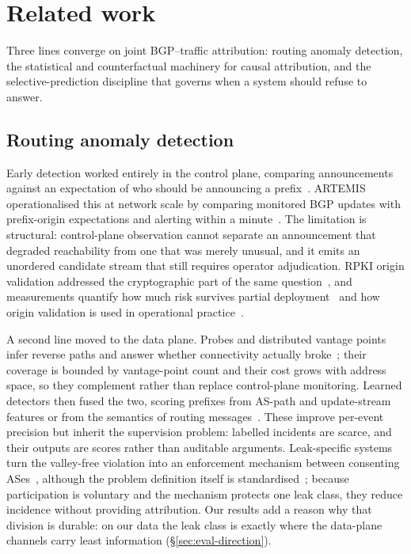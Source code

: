 \section{Related work}
\label{sec:related}

Three lines converge on joint BGP--traffic attribution: routing anomaly
detection, the statistical and counterfactual machinery for causal
attribution, and the selective-prediction discipline that governs when a
system should refuse to answer.

\subsection{Routing anomaly detection}

Early detection worked entirely in the control plane, comparing
announcements against an expectation of who should be announcing a
prefix~\cite{rfc6811}. ARTEMIS operationalised this at network scale by
comparing monitored BGP updates with prefix-origin expectations and
alerting within a minute~\cite{artemis}. The limitation is structural:
control-plane observation cannot separate an announcement that degraded
reachability from one that was merely unusual, and it emits an unordered
candidate stream that still requires operator adjudication. RPKI origin
validation addressed the cryptographic part of the same
question~\cite{rfc6811,rodday-2024-rpki}, and measurements quantify how
much risk survives partial deployment~\cite{rpki-coming-of-age-2019} and
how origin validation is used in operational practice~\cite{rovista-2023}.

A second line moved to the data plane. Probes and distributed vantage
points infer reverse paths and answer whether connectivity actually
broke~\cite{netalyzr-2013}; their coverage is bounded by vantage-point
count and their cost grows with address space, so they complement rather
than replace control-plane monitoring. Learned detectors then fused the
two, scoring prefixes from AS-path and update-stream features or from the
semantics of routing messages~\cite{beam2024}. These improve per-event
precision but inherit the supervision problem: labelled incidents are
scarce, and their outputs are scores rather than auditable arguments.
Leak-specific systems turn the valley-free violation into an enforcement
mechanism between consenting ASes~\cite{peerlock}, although the problem
definition itself is standardised~\cite{rfc7908,rfc9234}; because
participation is voluntary and the mechanism protects one leak class, they
reduce incidence without providing attribution. Our results add a reason
why that division is durable: on our data the leak class is exactly where
the data-plane channels carry least information
(\S\ref{sec:eval-direction}).

